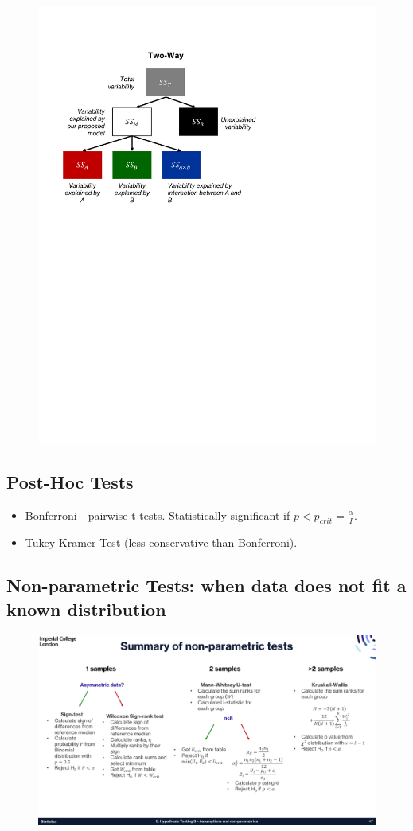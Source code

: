 \documentclass{article}
\begin{document}
\begin{figure}[H]
    \centering
    \includegraphics[width=.5\textwidth]{./images/twoWayANOVA.pdf}
\end{figure}
\subsection*{Post-Hoc Tests}
\begin{itemize}
            \item Bonferroni - pairwise t-tests. Statistically significant if $p < p_{crit}=\frac{\alpha}{I}$.
            \item Tukey Kramer Test (less conservative than Bonferroni).
        \end{itemize}
        
        
        
\subsection{Non-parametric Tests: \footnotesize{when data does not fit a known distribution}}
\begin{figure}[H]
    \centering
    \includegraphics[width=\textwidth]{./images/nonparasummary.pdf}
\end{figure}
\end{document}
